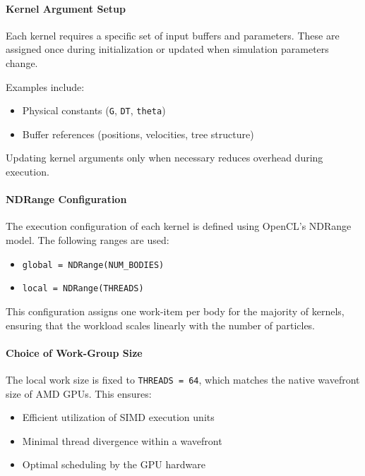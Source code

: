 \documentclass[12pt]{article}
\begin{document}
\paragraph{Kernel Argument Setup}

Each kernel requires a specific set of input buffers and parameters.
These are assigned once during initialization or updated when simulation
parameters change.

Examples include:

\begin{itemize}
    \item Physical constants (\texttt{G}, \texttt{DT}, \texttt{theta})
    \item Buffer references (positions, velocities, tree structure)
\end{itemize}

Updating kernel arguments only when necessary reduces overhead during execution.

\paragraph{NDRange Configuration}

The execution configuration of each kernel is defined using OpenCL's NDRange model.
The following ranges are used:

\begin{itemize}
    \item \texttt{global = NDRange(NUM\_BODIES)}
    \item \texttt{local = NDRange(THREADS)}
\end{itemize}

This configuration assigns one work-item per body for the majority of kernels,
ensuring that the workload scales linearly with the number of particles.

\paragraph{Choice of Work-Group Size}

The local work size is fixed to \texttt{THREADS = 64}, which matches the native
wavefront size of AMD GPUs. This ensures:

\begin{itemize}
    \item Efficient utilization of SIMD execution units
    \item Minimal thread divergence within a wavefront
    \item Optimal scheduling by the GPU hardware
\end{itemize}
\end{document}
